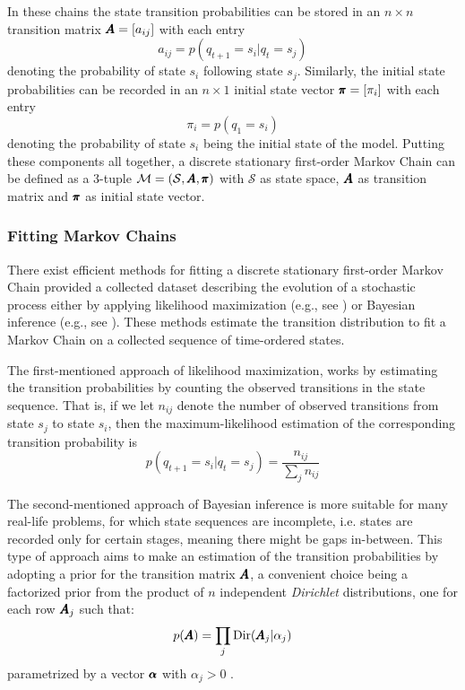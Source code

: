 In these chains the state transition probabilities can be stored in an $n \times n$ transition matrix $\pmb{A} = [a_{ij}]$ with each entry
\begin{equation}
	a_{ij} = p(q_{t+1} = s_i\vert q_t = s_j)
\end{equation}
denoting the probability of state $s_i$ following state $s_j$.
Similarly, the initial state probabilities can be recorded in an $n \times 1$ initial state vector $\pmb{\pi} = [\pi_i]$ with each entry
\begin{equation}
	\pi_i = p(q_1 = s_i)
\end{equation} 
denoting the probability of state $s_i$ being the initial state of the model.
Putting these components all together, a discrete stationary first-order Markov Chain can be defined as a 3-tuple $\mathcal{M} = (\mathcal{S}, \pmb{A}, \pmb{\pi})$ with $\mathcal{S}$ as state space, $\pmb{A}$ as transition matrix and $\pmb{\pi}$ as initial state vector.

\subsubsection*{Fitting Markov Chains}
There exist efficient methods for fitting a discrete stationary first-order Markov Chain provided a collected dataset describing the evolution of a stochastic process either by applying likelihood maximization (e.g., see \cite{bacciu2015probabilistic, barberBRML2012, lee1968maximum, teodorescu2009maximum}) or Bayesian inference (e.g., see \cite{barberBRML2012, lee1968maximum, minka2003bayesian}).
These methods estimate the transition distribution to fit a Markov Chain on a collected sequence of time-ordered states. 

The first-mentioned approach of likelihood maximization, works by estimating the transition probabilities by counting the observed transitions in the state sequence.
That is, if we let $n_{ij}$ denote the number of observed transitions from state $s_j$ to state $s_i$, then the maximum-likelihood estimation of the corresponding transition probability is
\begin{equation}
	p(q_{t+1} = s_i\vert q_t = s_j) = \frac{n_{ij}}{\sum_j n_{ij}}
\end{equation}

The second-mentioned approach of Bayesian inference is more suitable for many real-life problems, for which state sequences are incomplete, i.e. states are recorded only for certain stages, meaning there might be gaps in-between.
This type of approach aims to make an estimation of the transition probabilities by adopting a prior for the transition matrix $\pmb{A}$, a convenient choice being a factorized prior from the product of $n$ independent \textit{Dirichlet} distributions, one for each row $\pmb{A}_j$ such that:
\begin{equation}
	p(\pmb{A}) = \prod_{j} \text{Dir}(\pmb{A}_j \vert \alpha_j)
\end{equation}
parametrized by a vector $\pmb{\alpha}$ with $\alpha_j > 0$ \cite{pasanisi2012estimating,barberBRML2012}.


